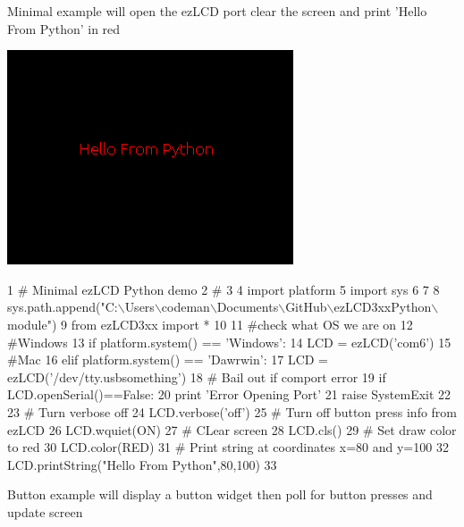 Minimal example will open the ez\-L\-C\-D port clear the screen and print 'Hello From Python' in red \par
  
\begin{DoxyImageNoCaption}
  \mbox{\includegraphics{minimal.png}}
\end{DoxyImageNoCaption}
 
\begin{DoxyCodeInclude}
1 \textcolor{comment}{# Minimal ezLCD Python demo}
2 \textcolor{comment}{#}
3 
4 \textcolor{keyword}{import} platform
5 \textcolor{keyword}{import} sys
6 
7 
8 sys.path.append(\textcolor{stringliteral}{"C:\(\backslash\)Users\(\backslash\)codeman\(\backslash\)Documents\(\backslash\)GitHub\(\backslash\)ezLCD3xxPython\(\backslash\)module"}) 
9 \textcolor{keyword}{from} ezLCD3xx \textcolor{keyword}{import} *
10 
11 \textcolor{comment}{#check what OS we are on}
12 \textcolor{comment}{#Windows}
13 \textcolor{keywordflow}{if} platform.system() == \textcolor{stringliteral}{'Windows'}:
14     LCD = ezLCD(\textcolor{stringliteral}{'com6'}) 
15 \textcolor{comment}{#Mac}
16 \textcolor{keywordflow}{elif} platform.system() == \textcolor{stringliteral}{'Dawrwin'}:
17     LCD = ezLCD(\textcolor{stringliteral}{'/dev/tty.usbsomething'})
18 \textcolor{comment}{# Bail out if comport error}
19 \textcolor{keywordflow}{if} LCD.openSerial()==\textcolor{keyword}{False}:
20     \textcolor{keywordflow}{print} \textcolor{stringliteral}{'Error Opening Port'}
21     \textcolor{keywordflow}{raise} SystemExit
22 
23 \textcolor{comment}{# Turn verbose off }
24 LCD.verbose(\textcolor{stringliteral}{'off'})
25 \textcolor{comment}{# Turn off button press info from ezLCD}
26 LCD.wquiet(ON)
27 \textcolor{comment}{# CLear screen}
28 LCD.cls()
29 \textcolor{comment}{# Set draw color to red}
30 LCD.color(RED)
31 \textcolor{comment}{# Print string at coordinates x=80 and y=100}
32 LCD.printString(\textcolor{stringliteral}{"Hello From Python"},80,100)
33 
\end{DoxyCodeInclude}
 Button example will display a button widget then poll for button presses and update screen \par
  
